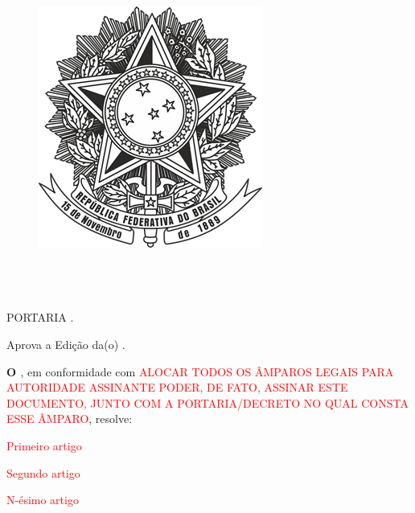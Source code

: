 
\begin{figure}[H]
    \centering
    \includegraphics[scale=0.5]{figuras/brasao_brasil.png}
\end{figure}

\begin{center}
    \textbf{\MakeUppercase{\imprimirinstituicao}} \\
    \MakeUppercase{\organizacaoMD}\\
    \\
    \vspace{0.5cm}
    PORTARIA \textcolor{red}{\portariapublicacao}.
\end{center}

\begin{flushright}

\parbox{6.5cm}{Aprova a Edição da(o) \textcolor{red}{\imprimirtitulo}.}

\end{flushright}

\textbf{O \textcolor{red}{\MakeUppercase{\autoridadeassinante}}}, em conformidade com \textcolor{red}{ALOCAR TODOS OS ÂMPAROS LEGAIS PARA AUTORIDADE ASSINANTE PODER, DE FATO, ASSINAR ESTE DOCUMENTO, JUNTO COM A PORTARIA/DECRETO NO QUAL CONSTA ESSE ÂMPARO}, resolve:

\begin{artenum}[{Art.} 1 {º}]
    \item \textcolor{red}{Primeiro artigo}
    \item \textcolor{red}{Segundo artigo}
    \item \textcolor{red}{N-ésimo artigo}
\end{artenum}

\vspace{3.0cm}

